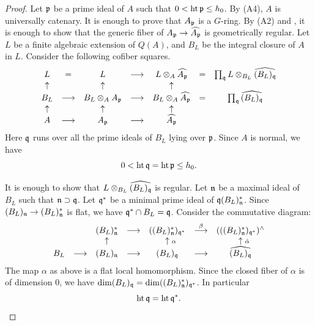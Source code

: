 \documentclass[11pt,a4paper]{amsart}
\theoremstyle{definition}
\theoremstyle{remark}
\newcommand{\Ht}{\operatorname{ht}}
\newcommand{\fp}{\frak{p}}
\newcommand{\fq}{\frak{q}}
\newcommand{\fn}{\frak{n}}
\begin{document}
\begin{proof}
Let $\fp$ be a prime ideal of $A$ such that $0 < \Ht \fp \le h_0$.
By (A4), $A$ is universally catenary.
It is enough to prove that $A_\fp$ is a $G$-ring.
By (A2) and \cite[Theorem 75]{Ma80}, it is enough to show that the generic fiber of $A_\fp \rightarrow \widehat{A_\fp}$ is geometrically regular. Let $L$ be a finite algebraic extension of $Q(A)$, and $B_L$ be the integral closure of $A$ in $L$. Consider the following cofiber squares.
\[
\begin{array}{ccccccc}
L & = & L & \longrightarrow & L\otimes_{A}\widehat{A_{\fp}} & = & 
\prod_{\fq} L \otimes_{B_{L}} \widehat{(B_{L})_{\fq}} \\
\uparrow & & \uparrow & & \uparrow & & \\
B_{L} & \longrightarrow & B_{L} \otimes_{A}A_{\fp} & \longrightarrow &
B_{L} \otimes_{A} \widehat{A_{\fp}} & = & \prod_\fq \widehat{(B_{L})_{\fq}} \\
\uparrow & & \uparrow & & \uparrow & & \\
A & \longrightarrow & A_\fp  & \longrightarrow & \widehat{A_\fp} 
\end{array}
\]
Here $\fq$ runs over all the prime ideals of $B_L$ lying over $\fp$.
Since $A$ is normal, we have
\begin{equation}\label{pq}
0 < \Ht \fq = \Ht \fp \le h_0.
\end{equation}

It is enough to show that $L \otimes_{B_{L}} \widehat{(B_{L})_{\fq}}$
is regular. Let $\fn$ be a maximal ideal of $B_L$ such that $\fn \supset \fq$.
Let $\fq^*$ be a minimal prime ideal of $\fq (B_L)_\fn^*$.
Since $(B_L)_\fn \rightarrow (B_L)_\fn^*$ is flat, we have $\fq^* \cap B_L = \fq$. Consider the commutative diagram:
\[
\begin{array}{ccccccc}
 &  & (B_{L})_{\fn}^* & \longrightarrow & ((B_{L})_{\fn}^*)_{\fq^*} & 
\stackrel{\beta}{\longrightarrow} & ( ((B_{L})_{\fn}^*)_{\fq^*} )^\wedge \\
& & \uparrow & & \hphantom{\scriptstyle \alpha}\uparrow{\scriptstyle \alpha} & &
 \hphantom{\scriptstyle \hat{\alpha}}\uparrow{\scriptstyle \hat{\alpha}}  \\
B_{L} & \longrightarrow & (B_{L})_\fn
& \longrightarrow &
(B_{L})_\fq  & \longrightarrow  & \widehat{(B_{L})_\fq} 
\end{array}
\]
The map $\alpha$ as above is a flat local homomorphism.
Since the closed fiber of $\alpha$ is of dimension $0$, we have
$\dim (B_{L})_\fq = \dim ((B_{L})_{\fn}^*)_{\fq^*}$.
In particular 
\begin{equation}\label{q*}
\Ht \fq = \Ht \fq^*.
\end{equation}


\end{proof}
\end{document}
